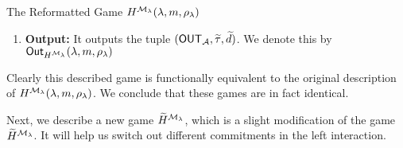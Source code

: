 \begin{AlgorithmBox}[label={pq:hybrid:H:reinterpretation}]{The Reformatted Game \textnormal{$H^{\mcal{M}_\secpar}(\secpar, m, \rho_\secpar)$}}
\begin{enumerate}
 We introduce the following notation to describe this stage. Define a QPT machine $\Adv$ that takes as input $(\msf{st}_{\mcal{M}}, \tilde{\tau})$; Machine $\mcal{A}_\secpar$ is supposed to run the residual strategy of $\mcal{M}_\secpar$ starting from $\msf{st}_{\mcal{M}}$. Also, define a QPT machine $\mcal{B}$ that takes as input $(\msf{st}_C, \msf{st}_R, \tilde{\tau})$; Machine $\mcal{B}$ is supposed to run the residual strategies of the honest committer $C$ and receiver $R$, starting from 
$\msf{st}_C$ and $\msf{st}_R$ respectively. With the above notation, we can denote the execution of the remaining steps of $H^{\mcal{M}_\secpar}(\secpar,m,\rho_\secpar)$ by
\begin{equation}\label[Expression]{pq:expression:hybrid:H:remainder}
(\OUT_\mcal{A}, \tilde{d})\gets \langle \mcal{A}_\secpar(\msf{st}_{\mcal{M}}), \mcal{B}(\msf{st}_C, \msf{st}_R) \rangle(1^\secpar, \tilde{\tau}),
\end{equation}
where $\OUT_\mcal{A}$ is the output of $\mcal{A}_\secpar$, and $\tilde{d} \in \Set{\bot, \top}$ is the output of the honest receiver $R$ (in the right), indicating if the man-in-the-middle's commitment (i.e., the right session) is accepted ($\tilde{d} = \top$) or not ($\tilde{d} = \bot$). (We remark that $\OUT_\Adv$ is nothing but the man-in-the-middle $\mcal{M}$'s final output.)

\item
{\bf Output:} It outputs the tuple $(\mathsf{OUT}_\mathcal{A}, \widetilde{\tau}, \widetilde{d})$. We denote this by $\mathsf{Out}_{H^{\mathcal{M}_\lambda}}(\lambda, m, \rho_\lambda)$  
\end{enumerate}
\end{AlgorithmBox}

Clearly this described game is functionally equivalent to the original description of $H^{\mcal{M}_\secpar}(\secpar, m, \rho_\secpar)$. We conclude that these games are in fact identical. 
\fi 

Next, we describe a new game $\widetilde{H}^{\mathcal{M}_\lambda}$, which is a slight modification of the game  $\widetilde{H}^{\mathcal{M}_\lambda}$. It will help us switch out different commitments in the left interaction. 

